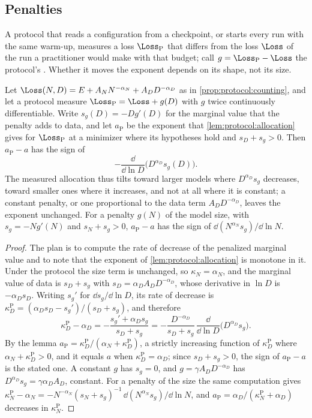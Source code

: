 \begin{refsection}
\subsection*{Penalties}

A protocol that reads a configuration from a checkpoint, or starts every run with the same warm-up, measures a loss $\Loss_{\mathrm P}$ that differs from the loss $\Loss$ of the run a practitioner would make with that budget; call $g=\Loss_{\mathrm P}-\Loss$ the protocol's . Whether it moves the exponent depends on its shape, not its size.

\begin{proposition}\label{prop:protocol:penalty}
Let $\Loss(N,D)=E+A_NN^{-\alpha_N}+A_DD^{-\alpha_D}$ as in \cref{prop:protocol:counting}, and let a protocol measure $\Loss_{\mathrm P}=\Loss+g(D)$ with $g$ twice continuously differentiable. Write $s_g(D)=-Dg'(D)$ for the marginal value that the penalty adds to data, and let $a_{\mathrm P}$ be the exponent that \cref{lem:protocol:allocation} gives for $\Loss_{\mathrm P}$ at a minimizer where its hypotheses hold and $s_D+s_g>0$. Then $a_{\mathrm P}-a$ has the sign of
\[
-\frac{\dd}{\dd\ln D}\bigl(D^{\alpha_D}s_g(D)\bigr).
\]
The measured allocation thus tilts toward larger models where $D^{\alpha_D}s_g$ decreases, toward smaller ones where it increases, and not at all where it is constant; a constant penalty, or one proportional to the data term $A_DD^{-\alpha_D}$, leaves the exponent unchanged. For a penalty $g(N)$ of the model size, with $s_g=-Ng'(N)$ and $s_N+s_g>0$, $a_{\mathrm P}-a$ has the sign of $\dd(N^{\alpha_N}s_g)/\dd\ln N$.
\end{proposition}

\begin{proof}
The plan is to compute the rate of decrease of the penalized marginal value and to note that the exponent of \cref{lem:protocol:allocation} is monotone in it. Under the protocol the size term is unchanged, so $\kappa_N=\alpha_N$, and the marginal value of data is $s_D+s_g$ with $s_D=\alpha_DA_DD^{-\alpha_D}$, whose derivative in $\ln D$ is $-\alpha_Ds_D$. Writing $s_g'$ for $\dd s_g/\dd\ln D$, its rate of decrease is
$\kappa_D^{\mathrm P}=(\alpha_Ds_D-s_g')/(s_D+s_g)$, and therefore
\[
\kappa_D^{\mathrm P}-\alpha_D=-\frac{s_g'+\alpha_Ds_g}{s_D+s_g}=-\frac{D^{-\alpha_D}}{s_D+s_g}\,\frac{\dd}{\dd\ln D}\bigl(D^{\alpha_D}s_g\bigr).
\]
By the lemma $a_{\mathrm P}=\kappa_D^{\mathrm P}/(\alpha_N+\kappa_D^{\mathrm P})$, a strictly increasing function of $\kappa_D^{\mathrm P}$ where $\alpha_N+\kappa_D^{\mathrm P}>0$, and it equals $a$ when $\kappa_D^{\mathrm P}=\alpha_D$; since $s_D+s_g>0$, the sign of $a_{\mathrm P}-a$ is the stated one. A constant $g$ has $s_g=0$, and $g=\gamma A_DD^{-\alpha_D}$ has $D^{\alpha_D}s_g=\gamma\alpha_DA_D$, constant. For a penalty of the size the same computation gives $\kappa_N^{\mathrm P}-\alpha_N=-N^{-\alpha_N}(s_N+s_g)^{-1}\,\dd(N^{\alpha_N}s_g)/\dd\ln N$, and $a_{\mathrm P}=\alpha_D/(\kappa_N^{\mathrm P}+\alpha_D)$ decreases in $\kappa_N^{\mathrm P}$.
\end{proof}


\end{refsection}
